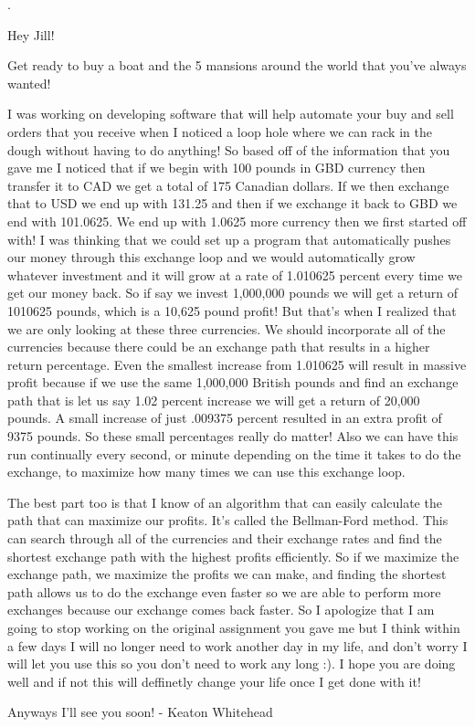 \documentclass[12pt]{article}
\begin{document}
\renewcommand{\headrulewidth}{0.5pt}


.

Hey Jill!

	Get ready to buy a boat and the 5 mansions around the world that you've always wanted!
	
I was working on developing software that will help automate your buy and sell orders that you receive when I noticed a loop hole where we can rack in the dough without having to do anything!
So based off of the information that you gave me I noticed that if we begin with 100 pounds in GBD currency then transfer it to CAD we get a total of 175 Canadian dollars. If we then exchange that to USD we end up with 131.25 and then if we exchange it back to GBD we end with 101.0625. We end up with 1.0625 more currency then we first started off with! I was thinking that we could set up a program that automatically pushes our money through this exchange loop and we would automatically grow whatever investment and it will grow at a rate of 1.010625 percent every time we get our money back. So if say we invest 1,000,000 pounds we will get a return of 1010625 pounds, which is a 10,625 pound profit! But that's when I realized that we are only looking at these three currencies. We should incorporate all of the currencies because there could be an exchange path that results in a higher return percentage. Even the smallest increase from 1.010625 will result in massive profit because if we use the same 1,000,000 British pounds and find an exchange path that is let us say 1.02 percent increase we will get a return of 20,000 pounds. A small increase of just .009375 percent resulted in an extra profit of 9375 pounds. So these small percentages really do matter! Also we can have this run continually every second, or minute depending on the time it takes to do the exchange, to maximize how many times we can use this exchange loop.

	The best part too is that I know of an algorithm that can easily calculate the path that can maximize our profits. It's called the Bellman-Ford method. This can search through all of the currencies and their exchange rates and find the shortest exchange path with the highest profits efficiently. So if  
we maximize the exchange path, we maximize the profits we can make, and finding the shortest path allows us to do the exchange even faster so we are able to perform more exchanges because our exchange comes back faster.
So I apologize that I am going to stop working on the original assignment you gave me but I think within a few days I will no longer need to work another day in my life, and don't worry I will let you use this so you don't need to work any long :). I hope you are doing well and if not this will deffinetly change your life once I get done with it! 

Anyways I'll see you soon! - Keaton Whitehead
\mbox{}
\newpage
\pagebreak
\end{document}
